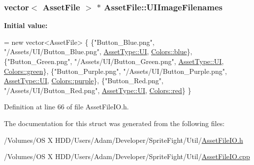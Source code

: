 \hypertarget{struct_asset_file_a453cc790da71efe1ad15a45d1a3cde40}{
\subsubsection[{U\-I\-Image\-Filenames}]{\setlength{\rightskip}{0pt plus 5cm}vector$<$ {\bf Asset\-File} $>$ $\ast$ Asset\-File\-::\-U\-I\-Image\-Filenames\hspace{0.3cm}{\ttfamily [static]}}}\label{struct_asset_file_a453cc790da71efe1ad15a45d1a3cde40}
{\bfseries Initial value\-:}
\begin{DoxyCode}
= \textcolor{keyword}{new} vector<AssetFile> \{
    \{\textcolor{stringliteral}{"Button\_Blue.png"},     \textcolor{stringliteral}{"/Assets/UI/Button\_Blue.png"},   \hyperlink{_asset_file_i_o_8h_a72d924d1cb8e1544b6d5198e98d52ca9a71ff71526d15db86eb50fcac245d183b}{AssetType::UI}, 
      \hyperlink{_character_data_8h_a55ecd4f2ec2ebfe8d5b0163e4ac2a967a48d6215903dff56238e52e8891380c8f}{Colors::blue}\},
    \{\textcolor{stringliteral}{"Button\_Green.png"},    \textcolor{stringliteral}{"/Assets/UI/Button\_Green.png"},  \hyperlink{_asset_file_i_o_8h_a72d924d1cb8e1544b6d5198e98d52ca9a71ff71526d15db86eb50fcac245d183b}{AssetType::UI}, 
      \hyperlink{_character_data_8h_a55ecd4f2ec2ebfe8d5b0163e4ac2a967a9f27410725ab8cc8854a2769c7a516b8}{Colors::green}\},
    \{\textcolor{stringliteral}{"Button\_Purple.png"},   \textcolor{stringliteral}{"/Assets/UI/Button\_Purple.png"}, \hyperlink{_asset_file_i_o_8h_a72d924d1cb8e1544b6d5198e98d52ca9a71ff71526d15db86eb50fcac245d183b}{AssetType::UI}, 
      \hyperlink{_character_data_8h_a55ecd4f2ec2ebfe8d5b0163e4ac2a967abb7aedfa61007447dd6efaf9f37641e3}{Colors::purple}\},
    \{\textcolor{stringliteral}{"Button\_Red.png"},      \textcolor{stringliteral}{"/Assets/UI/Button\_Red.png"},    \hyperlink{_asset_file_i_o_8h_a72d924d1cb8e1544b6d5198e98d52ca9a71ff71526d15db86eb50fcac245d183b}{AssetType::UI}, 
      \hyperlink{_character_data_8h_a55ecd4f2ec2ebfe8d5b0163e4ac2a967abda9643ac6601722a28f238714274da4}{Colors::red}\}
\}
\end{DoxyCode}


Definition at line 66 of file Asset\-File\-I\-O.\-h.



The documentation for this struct was generated from the following files\-:\begin{DoxyCompactItemize}
\item 
/\-Volumes/\-O\-S X H\-D\-D/\-Users/\-Adam/\-Developer/\-Sprite\-Fight/\-Util/\hyperlink{_asset_file_i_o_8h}{Asset\-File\-I\-O.\-h}\item 
/\-Volumes/\-O\-S X H\-D\-D/\-Users/\-Adam/\-Developer/\-Sprite\-Fight/\-Util/\hyperlink{_asset_file_i_o_8cpp}{Asset\-File\-I\-O.\-cpp}\end{DoxyCompactItemize}
